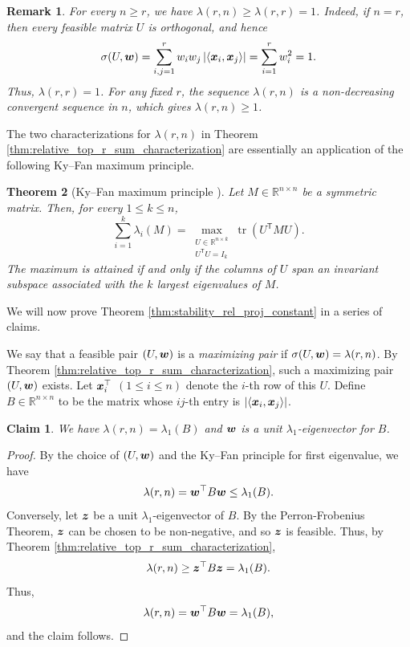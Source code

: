 \documentclass[11pt]{article}
\theoremstyle{plain}
\newtheorem{theorem}{Theorem}[section]
\newtheorem{claim}{Claim}[section]
\newtheorem{remark}[theorem]{Remark}
\numberwithin{equation}{section}
\DeclareMathOperator{\tr}{tr}
\def\w{\mbox{\boldmath $w$}}
\def\x{\mbox{\boldmath $x$}}
\def\z{\mbox{\boldmath $z$}}
\newcommand{\ip}[2]{\langle #1, #2 \rangle}
\begin{document}
\begin{remark} \label{remark:lambda_is_positive}
For every \(n\ge r\), we have
$\lambda(r,n)\ge \lambda(r,r)=1$.
Indeed, if \(n=r\), then every feasible matrix \(U\) is orthogonal, and hence
\[
\sigma(U,\w)
=\sum_{i,j=1}^r w_iw_j
 \left|\ip{\x_i}{\x_j}\right|
=\sum_{i=1}^r w_i^2
=1.
\]
Thus, \(\lambda(r,r)=1\). For any fixed $r$, the sequence $\lambda(r,n)$ is a non-decreasing convergent sequence in $n$, which gives $\lambda(r,n)\ge 1$.
\end{remark}

The two characterizations for $\lambda(r,n)$ in Theorem \ref{thm:relative_top_r_sum_characterization} are essentially an application of the following Ky--Fan maximum principle.

\begin{theorem}[Ky--Fan maximum principle {\cite[Corollary~4.3.39]{Horn_Johnson_2013}}]\label{thm:Ky_Fan}
Let $M\in\mathbb{R}^{n\times n}$ be a symmetric matrix. Then, for every $1\leq k\leq n$,
\[
\sum_{i=1}^k \lambda_i(M)
=
\max_{\substack{U\in\mathbb{R}^{n\times k}\\ U^{\mathsf T}U=I_k}}
\tr\left(U^{\mathsf T}MU\right).
\]
The maximum is attained if and only if the columns of $U$ span an invariant
subspace associated with the $k$ largest eigenvalues of $M$.
\end{theorem}

We will now prove Theorem \ref{thm:stability_rel_proj_constant} in a series of claims.  

We say that a feasible pair $(U,\w)$ is a \emph{maximizing pair} if $\sigma(U, \w) = \lambda(r,n)$. By Theorem \ref{thm:relative_top_r_sum_characterization}, such a maximizing pair $(U, \w)$ exists. Let $\x_i^\top$ $(1\le i\le n)$ denote the $i$-th row of this $U$. Define $B\in \mathbb{R}^{n\times n}$ to be the matrix whose $ij$-th entry is $|\ip{\x_i}{\x_j}|$. 

\begin{claim}\label{claim:spectral_radius_B}
We have $\lambda(r,n) = \lambda_1(B)$ and $\w$ is a unit $\lambda_1$-eigenvector for $B$. 
\end{claim}

\begin{proof} By the choice of $(U, \w)$ and the Ky--Fan principle for first eigenvalue, we have 
\[ \lambda(r,n) =\w^\top B\w \le \lambda_1(B).\]
Conversely, let $\z$ be a unit $\lambda_1$-eigenvector of $B$. By the Perron-Frobenius Theorem, $\z$ can be chosen to be non-negative, and so $\z$ is feasible. Thus, by Theorem \ref{thm:relative_top_r_sum_characterization},
\[\lambda(r,n) \ge \z^\top B\z = \lambda_1(B).\]
Thus, 
\[ \lambda(r, n) = \w^\top  B\w = \lambda_1(B),\]
and the claim follows.
\end{proof}
\end{document}
